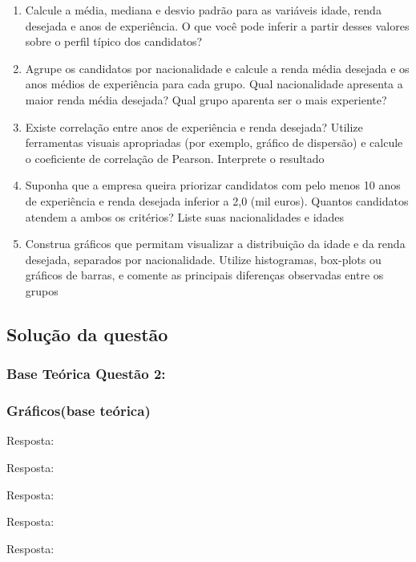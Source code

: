 \documentclass[a4paper,11pt]{article}
\begin{document}
\begin{enumerate}[leftmargin=*]
\item Calcule a média, mediana e desvio padrão para as variáveis idade, renda desejada e
anos de experiência. O que você pode inferir a partir desses valores sobre o perfil típico dos candidatos?


\item  Agrupe os candidatos por nacionalidade e calcule a renda média desejada e os anos
médios de experiência para cada grupo. Qual nacionalidade apresenta a maior renda
média desejada? Qual grupo aparenta ser o mais experiente?

\item Existe correlação entre anos de experiência e renda desejada? Utilize ferramentas visuais apropriadas (por exemplo, gráfico de dispersão) e calcule o coeficiente de correlação
de Pearson. Interprete o resultado

\item Suponha que a empresa queira priorizar candidatos com pelo menos 10 anos de experiência e renda desejada inferior a 2,0 (mil euros). Quantos candidatos atendem a ambos
os critérios? Liste suas nacionalidades e idades

\item Construa gráficos que permitam visualizar a distribuição da idade e da renda desejada,
separados por nacionalidade. Utilize histogramas, box-plots ou gráficos de barras, e
comente as principais diferenças observadas entre os grupos

\end{enumerate}

\subsection*{Solução da questão} 					

\subsubsection*{Base Teórica Questão 2:} 



\subsubsection*{Gráficos(base teórica)} 


\begin{description}[leftmargin=*]

\item[2.1] Resposta: \\

\item[2.2] Resposta: \\

\item[2.3] Resposta: \\

\item[2.4] Resposta: \\

\item[2.5] Resposta: \\

\end{description}
\end{document}
